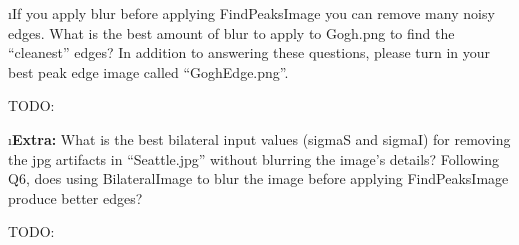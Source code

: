 \documentclass[fleqn]{article}
\begin{document}
\i If you apply blur before applying FindPeaksImage you can remove many noisy edges. What is the best amount of blur to apply to Gogh.png to find the “cleanest” edges? In addition to answering these questions, please turn in your best peak edge image called “GoghEdge.png”.
 \begin{solution}
     TODO:
 \end{solution}

\i {\bf Extra:} What is the best bilateral input values (sigmaS and sigmaI) for removing the jpg artifacts in “Seattle.jpg” without blurring the image’s details? Following Q6, does using BilateralImage to blur the image before applying FindPeaksImage produce better edges?
 \begin{solution}
     TODO:
 \end{solution}

\ene
\end{document}
